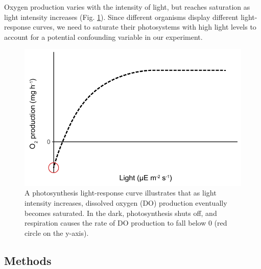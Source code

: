 \documentclass[]{krantz}
\theoremstyle{definition}
\theoremstyle{definition}
\theoremstyle{definition}
\theoremstyle{remark}
\begin{document}
Oxygen production varies with the intensity of light, but reaches
saturation as light intensity increases (Fig.
\ref{fig:light-response-fig}). Since different organisms display
different light-response curves, we need to saturate their photosystems
with high light levels to account for a potential confounding variable
in our experiment.

\begin{figure}
\centering
\includegraphics{chapter_materials/physiological_ecology/light_response_curve.pdf}
\caption{\label{fig:light-response-fig}A photosynthesis light-response curve
illustrates that as light intensity increases, dissolved oxygen (DO)
production eventually becomes saturated. In the dark, photosynthesis
shuts off, and respiration causes the rate of DO production to fall
below 0 (red circle on the y-axis).}
\end{figure}

\subsection{Methods}\label{methods}
\end{document}
